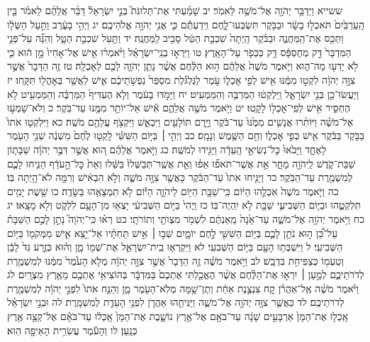 \documentclass[twoside, openany, parskip=half, 11pt]{book}
\begin{document}
ששייא וַיְדַבֵּ֥ר יְהֹוָ֖ה אֶל־מֹשֶׁ֥ה לֵּאמֹֽר׃ יב שָׁמַ֗עְתִּי אֶת־תְּלוּנֹּת֮ בְּנֵ֣י יִשְׂרָאֵל֒ דַּבֵּ֨ר אֲלֵהֶ֜ם לֵאמֹ֗ר בֵּ֤ין הָֽעַרְבַּ֙יִם֙ תֹּאכְל֣וּ בָשָׂ֔ר וּבַבֹּ֖קֶר תִּשְׂבְּעוּ־לָ֑חֶם וִֽידַעְתֶּ֕ם כִּ֛י אֲנִ֥י יְהֹוָ֖ה אֱלֹהֵיכֶֽם׃ יג וַיְהִ֣י בָעֶ֔רֶב וַתַּ֣עַל הַשְּׂלָ֔ו וַתְּכַ֖ס אֶת־הַֽמַּחֲנֶ֑ה וּבַבֹּ֗קֶר הָֽיְתָה֙ שִׁכְבַ֣ת הַטַּ֔ל סָבִ֖יב לַֽמַּחֲנֶֽה׃ יד וַתַּ֖עַל שִׁכְבַ֣ת הַטָּ֑ל וְהִנֵּ֞ה עַל־פְּנֵ֤י הַמִּדְבָּר֙ דַּ֣ק מְחֻסְפָּ֔ס דַּ֥ק כַּכְּפֹ֖ר עַל־הָאָֽרֶץ׃ טו וַיִּרְא֣וּ בְנֵֽי־יִשְׂרָאֵ֗ל וַיֹּ֨אמְר֜וּ אִ֤ישׁ אֶל־אָחִיו֙ מָ֣ן ה֔וּא כִּ֛י לֹ֥א יָדְע֖וּ מַה־ה֑וּא וַיֹּ֤אמֶר מֹשֶׁה֙ אֲלֵהֶ֔ם ה֣וּא הַלֶּ֔חֶם אֲשֶׁ֨ר נָתַ֧ן יְהֹוָ֛ה לָכֶ֖ם לְאׇכְלָֽה׃ טז זֶ֤ה הַדָּבָר֙ אֲשֶׁ֣ר צִוָּ֣ה יְהֹוָ֔ה לִקְט֣וּ מִמֶּ֔נּוּ אִ֖ישׁ לְפִ֣י אׇכְל֑וֹ עֹ֣מֶר לַגֻּלְגֹּ֗לֶת מִסְפַּר֙ נַפְשֹׁ֣תֵיכֶ֔ם אִ֛ישׁ לַאֲשֶׁ֥ר בְּאׇהֳל֖וֹ תִּקָּֽחוּ׃ יז וַיַּעֲשׂוּ־כֵ֖ן בְּנֵ֣י יִשְׂרָאֵ֑ל וַֽיִּלְקְט֔וּ הַמַּרְבֶּ֖ה וְהַמַּמְעִֽיט׃ יח וַיָּמֹ֣דּוּ בָעֹ֔מֶר וְלֹ֤א הֶעְדִּיף֙ הַמַּרְבֶּ֔ה וְהַמַּמְעִ֖יט לֹ֣א הֶחְסִ֑יר אִ֥ישׁ לְפִֽי־אׇכְל֖וֹ לָקָֽטוּ׃ יט וַיֹּ֥אמֶר מֹשֶׁ֖ה אֲלֵהֶ֑ם אִ֕ישׁ אַל־יוֹתֵ֥ר מִמֶּ֖נּוּ עַד־בֹּֽקֶר׃ כ וְלֹא־שָׁמְע֣וּ אֶל־מֹשֶׁ֗ה וַיּוֹתִ֨רוּ אֲנָשִׁ֤ים מִמֶּ֙נּוּ֙ עַד־בֹּ֔קֶר וַיָּ֥רֻם תּוֹלָעִ֖ים וַיִּבְאַ֑שׁ וַיִּקְצֹ֥ף עֲלֵהֶ֖ם מֹשֶֽׁה׃ כא וַיִּלְקְט֤וּ אֹתוֹ֙ בַּבֹּ֣קֶר בַּבֹּ֔קֶר אִ֖ישׁ כְּפִ֣י אׇכְל֑וֹ וְחַ֥ם הַשֶּׁ֖מֶשׁ וְנָמָֽס׃ כב וַיְהִ֣י ׀ בַּיּ֣וֹם הַשִּׁשִּׁ֗י לָֽקְט֥וּ לֶ֙חֶם֙ מִשְׁנֶ֔ה שְׁנֵ֥י הָעֹ֖מֶר לָאֶחָ֑ד וַיָּבֹ֙אוּ֙ כׇּל־נְשִׂיאֵ֣י הָֽעֵדָ֔ה וַיַּגִּ֖ידוּ לְמֹשֶֽׁה׃ כג וַיֹּ֣אמֶר אֲלֵהֶ֗ם ה֚וּא אֲשֶׁ֣ר דִּבֶּ֣ר יְהֹוָ֔ה שַׁבָּת֧וֹן שַׁבַּת־קֹ֛דֶשׁ לַֽיהֹוָ֖ה מָחָ֑ר אֵ֣ת אֲשֶׁר־תֹּאפ֞וּ אֵפ֗וּ וְאֵ֤ת אֲשֶֽׁר־תְּבַשְּׁלוּ֙ בַּשֵּׁ֔לוּ וְאֵת֙ כׇּל־הָ֣עֹדֵ֔ף הַנִּ֧יחוּ לָכֶ֛ם לְמִשְׁמֶ֖רֶת עַד־הַבֹּֽקֶר׃ כד וַיַּנִּ֤יחוּ אֹתוֹ֙ עַד־הַבֹּ֔קֶר כַּאֲשֶׁ֖ר צִוָּ֣ה מֹשֶׁ֑ה וְלֹ֣א הִבְאִ֔ישׁ וְרִמָּ֖ה לֹא־הָ֥יְתָה בּֽוֹ׃ כה וַיֹּ֤אמֶר מֹשֶׁה֙ אִכְלֻ֣הוּ הַיּ֔וֹם כִּֽי־שַׁבָּ֥ת הַיּ֖וֹם לַיהֹוָ֑ה הַיּ֕וֹם לֹ֥א תִמְצָאֻ֖הוּ בַּשָּׂדֶֽה׃ כו שֵׁ֥שֶׁת יָמִ֖ים תִּלְקְטֻ֑הוּ וּבַיּ֧וֹם הַשְּׁבִיעִ֛י שַׁבָּ֖ת לֹ֥א יִֽהְיֶה־בּֽוֹ׃ כז וַֽיְהִי֙ בַּיּ֣וֹם הַשְּׁבִיעִ֔י יָצְא֥וּ מִן־הָעָ֖ם לִלְקֹ֑ט וְלֹ֖א מָצָֽאוּ׃
יג כח וַיֹּ֥אמֶר יְהֹוָ֖ה אֶל־מֹשֶׁ֑ה עַד־אָ֙נָה֙ מֵֽאַנְתֶּ֔ם לִשְׁמֹ֥ר מִצְוֺתַ֖י וְתוֹרֹתָֽי׃ כט רְא֗וּ כִּֽי־יְהֹוָה֮ נָתַ֣ן לָכֶ֣ם הַשַּׁבָּת֒ עַל־כֵּ֠ן ה֣וּא נֹתֵ֥ן לָכֶ֛ם בַּיּ֥וֹם הַשִּׁשִּׁ֖י לֶ֣חֶם יוֹמָ֑יִם שְׁב֣וּ ׀ אִ֣ישׁ תַּחְתָּ֗יו אַל־יֵ֥צֵא אִ֛ישׁ מִמְּקֹמ֖וֹ בַּיּ֥וֹם הַשְּׁבִיעִֽי׃ ל וַיִּשְׁבְּת֥וּ הָעָ֖ם בַּיּ֥וֹם הַשְּׁבִעִֽי׃ לא וַיִּקְרְא֧וּ בֵֽית־יִשְׂרָאֵ֛ל אֶת־שְׁמ֖וֹ מָ֑ן וְה֗וּא כְּזֶ֤רַע גַּד֙ לָבָ֔ן וְטַעְמ֖וֹ כְּצַפִּיחִ֥ת בִּדְבָֽשׁ׃ לב וַיֹּ֣אמֶר מֹשֶׁ֗ה זֶ֤ה הַדָּבָר֙ אֲשֶׁ֣ר צִוָּ֣ה יְהֹוָ֔ה מְלֹ֤א הָעֹ֙מֶר֙ מִמֶּ֔נּוּ לְמִשְׁמֶ֖רֶת לְדֹרֹתֵיכֶ֑ם לְמַ֣עַן ׀ יִרְא֣וּ אֶת־הַלֶּ֗חֶם אֲשֶׁ֨ר הֶאֱכַ֤לְתִּי אֶתְכֶם֙ בַּמִּדְבָּ֔ר בְּהוֹצִיאִ֥י אֶתְכֶ֖ם מֵאֶ֥רֶץ מִצְרָֽיִם׃ לג וַיֹּ֨אמֶר מֹשֶׁ֜ה אֶֽל־אַהֲרֹ֗ן קַ֚ח צִנְצֶ֣נֶת אַחַ֔ת וְתֶן־שָׁ֥מָּה מְלֹֽא־הָעֹ֖מֶר מָ֑ן וְהַנַּ֤ח אֹתוֹ֙ לִפְנֵ֣י יְהֹוָ֔ה לְמִשְׁמֶ֖רֶת לְדֹרֹתֵיכֶֽם׃ לד כַּאֲשֶׁ֛ר צִוָּ֥ה יְהֹוָ֖ה אֶל־מֹשֶׁ֑ה וַיַּנִּיחֵ֧הוּ אַהֲרֹ֛ן לִפְנֵ֥י הָעֵדֻ֖ת לְמִשְׁמָֽרֶת׃ לה וּבְנֵ֣י יִשְׂרָאֵ֗ל אָֽכְל֤וּ אֶת־הַמָּן֙ אַרְבָּעִ֣ים שָׁנָ֔ה עַד־בֹּאָ֖ם אֶל־אֶ֣רֶץ נוֹשָׁ֑בֶת אֶת־הַמָּן֙ אָֽכְל֔וּ עַד־בֹּאָ֕ם אֶל־קְצֵ֖ה אֶ֥רֶץ כְּנָֽעַן׃ לו וְהָעֹ֕מֶר עֲשִׂרִ֥ית הָאֵיפָ֖ה הֽוּא׃
\end{document}
